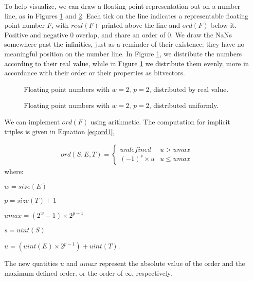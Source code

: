 \documentclass[letterpaper,10pt]{article}
\begin{document}
To help visualize, we can draw a floating point representation out on a number line, as in Figures \ref{fig:numberline1} and \ref{fig:numberline2}. Each tick on the line indicates a representable floating point number $F$, with $real(F)$ printed above the line and $ord(F)$ below it. Positive and negative 0 overlap, and share an order of 0. We draw the NaNs somewhere past the infinities, just as a reminder of their existence; they have no meaningful position on the number line. In Figure \ref{fig:numberline1}, we distribute the numbers according to their real value, while in Figure \ref{fig:numberline1} we distribute them evenly, more in accordance with their order or their properties as bitvectors.

\begin{figure}[t!]
 \centering
 \caption{Floating point numbers with $w=2$, $p=2$, distributed by real value.} \label{fig:numberline1}
 \smallskip
 \centering
\end{figure}

\begin{figure}[t!]
 \centering
 \caption{Floating point numbers with $w=2$, $p=2$, distributed uniformly.} \label{fig:numberline2}
 \smallskip
\end{figure}

We can implement $ord(F)$ using arithmetic. The computation for implicit triples is given in Equation \ref{eq:ord1},

\begin{align} \label{eq:ord1}
 ord(S, E, T) = 
 \begin{cases}
  undefined       & u > umax\\
  (-1)^s \times u & u \leq umax
 \end{cases}
\end{align}
where:
\begin{description}
 \item $w = size(E)$
 \item $p = size(T) + 1$
 \item $umax = (2^w-1) \times 2^{p-1}$
 \item $s = uint(S)$
 \item $u = (uint(E) \times 2^{p-1}) + uint(T)$.
\end{description}

The new quatities $u$ and $umax$ represent the absolute value of the order and the maximum defined order, or the order of $\infty$, respectively.





\end{document}
